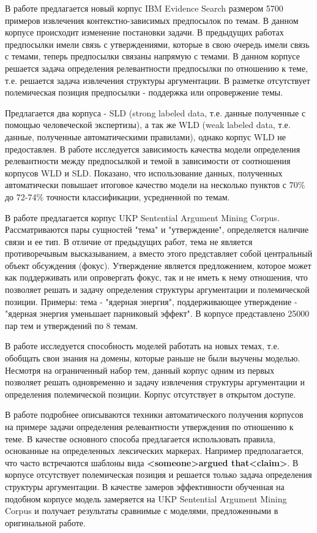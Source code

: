 В работе \cite{shnarch2018will} предлагается новый корпус IBM Evidence Search размером 5700 примеров извлечения контекстно-зависимых предпосылок по темам. В данном корпусе происходит изменение постановки задачи. В предыдущих работах предпосылки имели связь с утверждениями, которые в свою очередь имели связь с темами, теперь предпосылки связаны напрямую с темами. В данном корпусе решается задача определения релевантности предпосылки по отношению к теме, т.е. решается задача извлечения структуры аргументации. В разметке отсутствует полемическая позиция предпосылки - поддержка или опровержение темы.

Предлагается два корпуса - SLD (strong labeled data, т.е. данные полученные с помощью человеческой экспертизы), а так же WLD (weak labeled data, т.е. данные, полученные автоматическими правилами), однако корпус WLD не предоставлен. В работе исследуется зависимость качества модели определения релевантности между предпосылкой и темой в зависимости от соотношения корпусов WLD и SLD. Показано, что использование данных, полученных автоматически повышает итоговое качество модели на несколько пунктов с 70\% до 72-74\% точности классификации, усредненной по темам.

В работе \cite{stab2018cross} предлагается корпус UKP Sentential Argument Mining Corpus. Рассматриваются пары сущностей "тема" и "утверждение", определяется наличие связи и ее тип. В отличие от предыдущих работ, тема не является противоречывым высказыванием, а вместо этого представляет собой центральный объект обсуждения (фокус). Утверждение является предложением, которое может как поддерживать или опровергать фокус, так и не иметь к нему отношения, что позволяет решать и задачу определения структуры аргументации и полемической позиции. Примеры: тема - "ядерная энергия", поддерживающее утверждение - "ядерная энергия уменьшает парниковый эффект". В корпусе представлено 25000 пар тем и утверждений по 8 темам. 

В работе исследуется способность моделей работать на новых темах, т.е. обобщать свои знания на домены, которые раньше не были выучены моделью. Несмотря на ограниченный набор тем, данный корпус одним из первых позволяет решать одновременно и задачу извлечения структуры аргументации и определения полемической позиции. Корпус отсутствует в открытом доступе.

В работе \cite{levy2018towards} подробнее описываются техники автоматического получения корпусов на примере задачи определения релевантности утверждения по отношению к теме. В качестве основного способа предлагается использовать правила, основанные на определенных лексических маркерах. Например предполагается, что часто встречаются шаблоны вида \textbf{<someone>argued that<claim>}. В корпусе отсутствует полемическая позиция и решается только задача определения структуры аргументации. В качестве замеров эффективности обученная на подобном корпусе модель замеряется на UKP Sentential Argument Mining Corpus и получает результаты сравнимые с моделями, предложенными в оригинальной работе.

